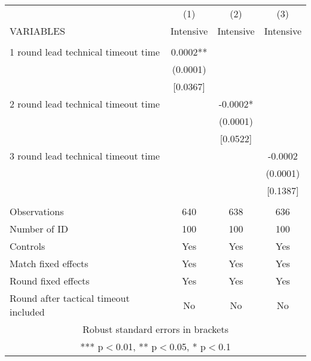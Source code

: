 \documentclass[]{article}
\begin{document}
\begin{tabular}{lccc} \hline
 & (1) & (2) & (3) \\
VARIABLES & Intensive & Intensive & Intensive \\ \hline
 &  &  &  \\
1 round lead technical timeout time & 0.0002** &  &  \\
 & (0.0001) &  &  \\
 & [0.0367] &  &  \\
2 round lead technical timeout time &  & -0.0002* &  \\
 &  & (0.0001) &  \\
 &  & [0.0522] &  \\
3 round lead technical timeout time &  &  & -0.0002 \\
 &  &  & (0.0001) \\
 &  &  & [0.1387] \\
 &  &  &  \\
Observations & 640 & 638 & 636 \\
Number of ID & 100 & 100 & 100 \\
Controls & Yes & Yes & Yes \\
Match fixed effects & Yes & Yes & Yes \\
Round fixed effects & Yes & Yes & Yes \\
 Round after tactical timeout included & No & No & No \\ \hline
\multicolumn{4}{c}{ Robust standard errors in brackets} \\
\multicolumn{4}{c}{ *** p$<$0.01, ** p$<$0.05, * p$<$0.1} \\
\end{tabular}
\end{document}
